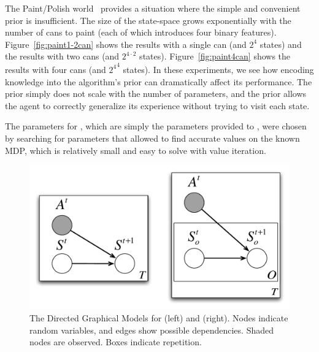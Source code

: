 The Paint/Polish world~\cite{walsh09a} provides a situation where the simple and convenient  prior is insufficient. The size of the state-space grows exponentially with the number of cans to paint (each of which introduces four binary features). Figure~\ref{fig:paint1-2can} shows the results with a single can (and $2^4$ states) and the results with two cans (and $2^{4\cdot 2}$ states). Figure~\ref{fig:paint4can} shows the results with four cans (and ${2^4}^4$ states). In these experiments, we see how encoding knowledge into the algorithm's prior can dramatically affect its performance. The  prior simply does not scale with the number of parameters, and the  prior allows the agent to correctly generalize its experience without trying to visit each state.

The parameters for , which are simply the parameters provided to , were chosen by searching for parameters that allowed  to find accurate values on the known MDP, which is relatively small and easy to solve with value iteration.

\begin{figure}
\vskip 0.2in
\begin{center}
\centerline{\includegraphics[width=.9\linewidth]{figures/dgms}}
\caption{
The Directed Graphical Models for  (left) and  (right). Nodes indicate random variables, and edges show possible dependencies. Shaded nodes are observed. Boxes indicate repetition.
}
\label{fig:dgms}
\end{center}
\vskip -0.2in
\end{figure} 

